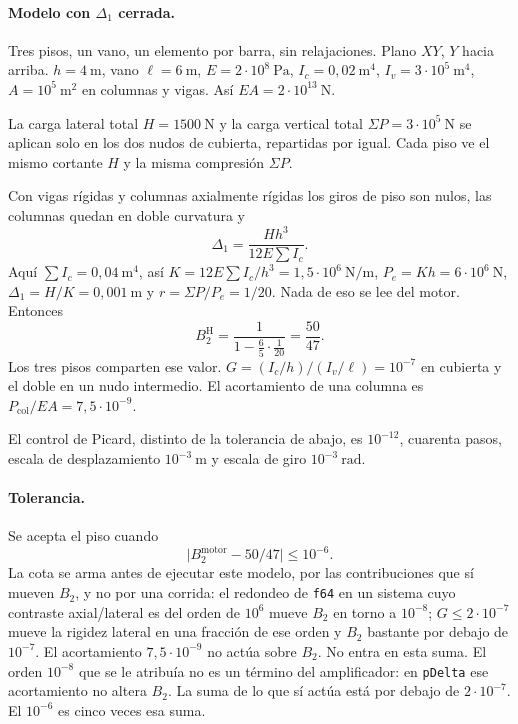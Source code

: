 \paragraph{Modelo con \(\Delta_1\) cerrada.}
Tres pisos, un vano, un elemento por barra, sin relajaciones. Plano \(XY\), \(Y\) hacia arriba. \(h=4~\mathrm{m}\), vano \(\ell=6~\mathrm{m}\), \(E=2\cdot 10^{8}~\mathrm{Pa}\), \(I_c=0{,}02~\mathrm{m}^4\), \(I_v=3\cdot 10^{5}~\mathrm{m}^4\), \(A=10^{5}~\mathrm{m}^2\) en columnas y vigas. Así \(EA=2\cdot 10^{13}~\mathrm{N}\).

La carga lateral total \(H=1500~\mathrm{N}\) y la carga vertical total \(\Sigma P=3\cdot 10^{5}~\mathrm{N}\) se aplican solo en los dos nudos de cubierta, repartidas por igual. Cada piso ve el mismo cortante \(H\) y la misma compresión \(\Sigma P\).

Con vigas rígidas y columnas axialmente rígidas los giros de piso son nulos, las columnas quedan en doble curvatura y
\begin{equation}
\Delta_1=\frac{H h^3}{12 E \sum I_c}.
\label{eq:val037-delta}
\end{equation}
Aquí \(\sum I_c=0{,}04~\mathrm{m}^4\), así \(K=12 E\sum I_c/h^3=1{,}5\cdot 10^{6}~\mathrm{N/m}\), \(P_e=Kh=6\cdot 10^{6}~\mathrm{N}\), \(\Delta_1=H/K=0{,}001~\mathrm{m}\) y \(r=\Sigma P/P_e=1/20\). Nada de eso se lee del motor. Entonces
\begin{equation}
B_2^{\mathrm{H}}=\frac{1}{1-\tfrac{6}{5}\cdot\tfrac{1}{20}}=\frac{50}{47}.
\label{eq:val037-valor}
\end{equation}
Los tres pisos comparten ese valor. \(G=(I_c/h)/(I_v/\ell)=10^{-7}\) en cubierta y el doble en un nudo intermedio. El acortamiento de una columna es \(P_{\mathrm{col}}/EA=7{,}5\cdot 10^{-9}\).

El control de Picard, distinto de la tolerancia de abajo, es \(10^{-12}\), cuarenta pasos, escala de desplazamiento \(10^{-3}~\mathrm{m}\) y escala de giro \(10^{-3}~\mathrm{rad}\).

\paragraph{Tolerancia.}
Se acepta el piso cuando
\begin{equation}
\bigl|B_2^{\mathrm{motor}}-50/47\bigr|\le 10^{-6}.
\label{eq:val037-tol}
\end{equation}
La cota se arma antes de ejecutar este modelo, por las contribuciones que sí mueven \(B_2\), y no por una corrida:
el redondeo de \texttt{f64} en un sistema cuyo contraste axial/lateral es del orden de \(10^{6}\) mueve \(B_2\) en torno a \(10^{-8}\);
\(G\le 2\cdot 10^{-7}\) mueve la rigidez lateral en una fracción de ese orden y \(B_2\) bastante por debajo de \(10^{-7}\).
El acortamiento \(7{,}5\cdot 10^{-9}\) no actúa sobre \(B_2\). No entra en esta suma. El orden \(10^{-8}\) que se le atribuía no es un término del amplificador: en \texttt{pDelta} ese acortamiento no altera \(B_2\).
La suma de lo que sí actúa está por debajo de \(2\cdot 10^{-7}\). El \(10^{-6}\) es cinco veces esa suma.

